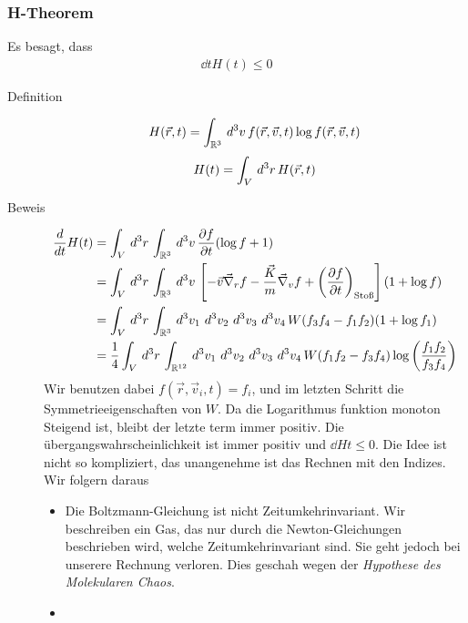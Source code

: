 \subsubsection*{H-Theorem}
Es besagt, dass %
\begin{align*}
  \dd{}{t} H(t) \le 0
\end{align*}
%
\begin{description}
  \item[Definition] 
    \begin{align*}
      H(\vec{r}, t) = \int_{\mathbb{R}^3}^{} \,d^3 v\, f(\vec{r}, \vec{v}, t) \log{} f(\vec{r}, \vec{v}, t)
    \end{align*}
    \begin{align*}
      H(t) = \int_{V}^{} \,d^3 r\, H(\vec{r}, t)
    \end{align*}
  \item[Beweis]
    \begin{align*}
      \frac{d{}}{d{t}} H(t) & = \int_{V}^{} \,d^3 r\, \int_{\mathbb{R}^3}^{} \,d^3 v\,
      \frac{\partial f }{\partial t} (\log{f} + 1)\\  & = \int_{V}^{} \,d^3 r \,\int_{\mathbb{R}^3}^{} \,d^3 v\,
      \left[ -\vec{v} \vec{\nabla}_r f - \frac{\vec{K}}{m} \vec{\nabla}_v f +
      \left( \frac{\partial f }{\partial t} \right)_\text{Stoß}\right] \left(  1 + \log{f} \right) \\
      & = \int_{V}^{} \,d^3 r\, \int_{\mathbb{R}^3}^{} \,d^3 v_1\, \,d^3 v_2\, \,d^3 v_3\, \,d^3 v_4\,
      W(f_3 f_4 - f_1 f_2)(1 + \log{f_1}) \\
      & = \frac{1}{4} \int_{V}^{} \,d^3 r\, \int_{\mathbb{R}^{12}}^{} \,d^3 v_1\, \,d^3 v_2\,
      \,d^3 v_3\, \,d^3 v_4\, W(f_1 f_2 - f_3 f_4) \log{\left( \frac{f_1 f_2}{f_3 f_4} \right)}
    \end{align*}
    Wir benutzen dabei $f(\vec{r}, \vec{v}_i, t) = f_i$, und im letzten Schritt
    die Symmetrieeigenschaften von $W$. Da die Logarithmus funktion monoton
    Steigend ist, bleibt der letzte term immer positiv. Die übergangswahrscheinlichkeit
    ist immer positiv und $\dd{H}{t} \le 0$. Die Idee ist nicht so kompliziert, 
    das unangenehme ist das Rechnen mit den Indizes. Wir folgern daraus
    \begin{itemize}
      \item Die Boltzmann-Gleichung ist nicht Zeitumkehrinvariant.
        Wir beschreiben ein Gas, das nur durch die Newton-Gleichungen beschrieben
        wird, welche Zeitumkehrinvariant sind. Sie geht jedoch bei unserere Rechnung
        verloren. Dies geschah wegen der \emph{Hypothese des Molekularen Chaos}.
      \item %

\end{itemize}
\end{description}
